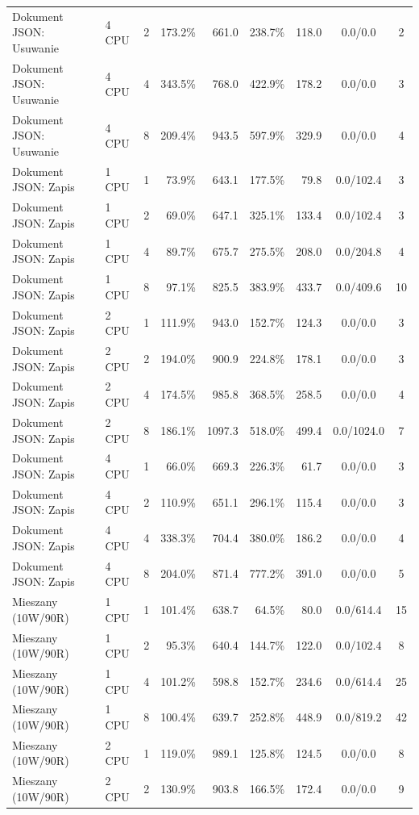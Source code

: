 \begin{table}[ht]
{\begin{tabular}{llcrrrrcc}
Dokument JSON: Usuwanie & 4 CPU & 2 & 173.2\% & 661.0 & 238.7\% & 118.0 & 0.0/0.0 & 2 \\
Dokument JSON: Usuwanie & 4 CPU & 4 & 343.5\% & 768.0 & 422.9\% & 178.2 & 0.0/0.0 & 3 \\
Dokument JSON: Usuwanie & 4 CPU & 8 & 209.4\% & 943.5 & 597.9\% & 329.9 & 0.0/0.0 & 4 \\
Dokument JSON: Zapis & 1 CPU & 1 & 73.9\% & 643.1 & 177.5\% & 79.8 & 0.0/102.4 & 3 \\
Dokument JSON: Zapis & 1 CPU & 2 & 69.0\% & 647.1 & 325.1\% & 133.4 & 0.0/102.4 & 3 \\
Dokument JSON: Zapis & 1 CPU & 4 & 89.7\% & 675.7 & 275.5\% & 208.0 & 0.0/204.8 & 4 \\
Dokument JSON: Zapis & 1 CPU & 8 & 97.1\% & 825.5 & 383.9\% & 433.7 & 0.0/409.6 & 10 \\
Dokument JSON: Zapis & 2 CPU & 1 & 111.9\% & 943.0 & 152.7\% & 124.3 & 0.0/0.0 & 3 \\
Dokument JSON: Zapis & 2 CPU & 2 & 194.0\% & 900.9 & 224.8\% & 178.1 & 0.0/0.0 & 3 \\
Dokument JSON: Zapis & 2 CPU & 4 & 174.5\% & 985.8 & 368.5\% & 258.5 & 0.0/0.0 & 4 \\
Dokument JSON: Zapis & 2 CPU & 8 & 186.1\% & 1097.3 & 518.0\% & 499.4 & 0.0/1024.0 & 7 \\
Dokument JSON: Zapis & 4 CPU & 1 & 66.0\% & 669.3 & 226.3\% & 61.7 & 0.0/0.0 & 3 \\
Dokument JSON: Zapis & 4 CPU & 2 & 110.9\% & 651.1 & 296.1\% & 115.4 & 0.0/0.0 & 3 \\
Dokument JSON: Zapis & 4 CPU & 4 & 338.3\% & 704.4 & 380.0\% & 186.2 & 0.0/0.0 & 4 \\
Dokument JSON: Zapis & 4 CPU & 8 & 204.0\% & 871.4 & 777.2\% & 391.0 & 0.0/0.0 & 5 \\
Mieszany (10W/90R) & 1 CPU & 1 & 101.4\% & 638.7 & 64.5\% & 80.0 & 0.0/614.4 & 15 \\
Mieszany (10W/90R) & 1 CPU & 2 & 95.3\% & 640.4 & 144.7\% & 122.0 & 0.0/102.4 & 8 \\
Mieszany (10W/90R) & 1 CPU & 4 & 101.2\% & 598.8 & 152.7\% & 234.6 & 0.0/614.4 & 25 \\
Mieszany (10W/90R) & 1 CPU & 8 & 100.4\% & 639.7 & 252.8\% & 448.9 & 0.0/819.2 & 42 \\
Mieszany (10W/90R) & 2 CPU & 1 & 119.0\% & 989.1 & 125.8\% & 124.5 & 0.0/0.0 & 8 \\
Mieszany (10W/90R) & 2 CPU & 2 & 130.9\% & 903.8 & 166.5\% & 172.4 & 0.0/0.0 & 9 \\

\end{tabular}}
\end{table}
